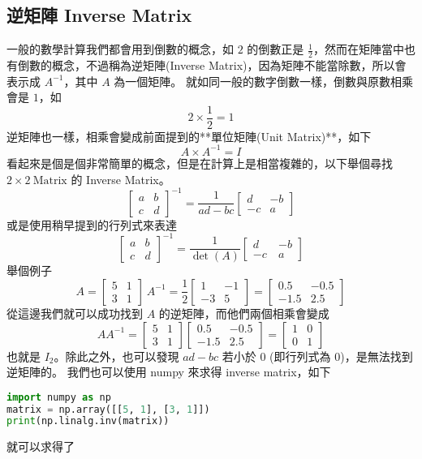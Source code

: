 \documentclass[11pt]{article}
\begin{document}
\pagebreak

\subsection{逆矩陣 Inverse Matrix}
一般的數學計算我們都會用到倒數的概念，如 $2$ 的倒數正是 $\frac{1}{2}$，然而在矩陣當中也有倒數的概念，不過稱為逆矩陣(Inverse Matrix)，因為矩陣不能當除數，所以會表示成 $A^{-1}$，其中 $A$ 為一個矩陣。
就如同一般的數字倒數一樣，倒數與原數相乘會是 $1$，如
\[
2 \times \frac{1}{2} = 1
\]
逆矩陣也一樣，相乘會變成前面提到的**單位矩陣(Unit Matrix)**，如下
\[
A \times A^{-1} = I
\]
看起來是個是個非常簡單的概念，但是在計算上是相當複雜的，以下舉個尋找 $2 \times 2  \ \mathrm{Matrix}$ 的 Inverse Matrix。
\[
  \begin{bmatrix}
  a & b \\ c & d
  \end{bmatrix}^{-1}
  =
  \frac{1}{ad - bc}
  \begin{bmatrix}
  d & -b \\ -c & a
  \end{bmatrix}
\]
或是使用稍早提到的行列式來表達
\[
  \begin{bmatrix}
  a & b \\ c & d
  \end{bmatrix}^{-1}
  =
  \frac{1}{\det (A)}
  \begin{bmatrix}
  d & -b \\ -c \  & a
  \end{bmatrix}
\]
舉個例子
\[
 A = \begin{bmatrix}
      5 & 1 \\
      3 & 1
  \end{bmatrix} \ 
  A^{-1} = \frac{1}{2} \begin{bmatrix}
      1 & -1 \\
      -3 & 5
  \end{bmatrix}
  =
  \begin{bmatrix}
      0.5 & -0.5 \\
      -1.5 & 2.5
  \end{bmatrix}
\]
從這邊我們就可以成功找到 $A$ 的逆矩陣，而他們兩個相乘會變成
\[
  AA^{-1}=
  \begin{bmatrix}
      5 & 1 \\
      3 & 1
  \end{bmatrix}
  \begin{bmatrix}
      0.5 & -0.5 \\
      -1.5 & 2.5
  \end{bmatrix}
  =
  \begin{bmatrix}
      1 & 0 \\
      0 & 1
  \end{bmatrix}
\]
也就是 $I_2$。除此之外，也可以發現 $ad-bc$ 若小於 $0$ (即行列式為 $0$)，是無法找到逆矩陣的。
我們也可以使用 numpy 來求得 inverse matrix，如下
\begin{lstlisting}[language=python]
import numpy as np
matrix = np.array([[5, 1], [3, 1]])
print(np.linalg.inv(matrix))
\end{lstlisting}
就可以求得了
\end{document}
